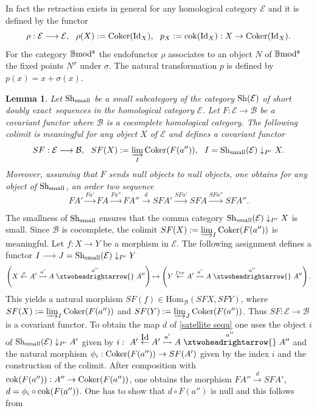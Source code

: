\documentclass[12pt]{article}
\newtheorem{lem}[thm]{Lemma}
\def\Hom{{\rm Hom}}
\def\id{{\rm id}}
\def\coker{{\rm Coker}}
\def\scoker{{\rm cok}}
\def\B{{\mathbb B}}
\def\exxx{{doubly exact}~}
\def\cB{{\mathcal B}}
\def\cE{{\mathcal E}}
\def\id{{\mbox{Id}}}
\def\Hom {{\mbox{Hom}}}
\def\sequ{{\rm Sh}}
\def\b2{{\rm \B mod^{\mathfrak s}}}
\begin{document}
 In fact the retraction exists in general for any homological category  $\cE$ and it is defined by the functor 
$$
\rho:\cE\longrightarrow \cE,\ \ \rho(X):=\coker(\id_X), \ \ p_X:=\scoker(\id_X):X\to \coker(\id_X).
$$
For  the category $\b2$ the endofunctor $\rho$ associates to an object $N$ of $\b2$  the fixed points $N^\sigma$ under $\sigma$. The natural transformation $p$ is defined by $p(x)=x+\sigma(x)$.
 \begin{lem}\label{first satellite} Let $\sequ_{\rm small}$ be a small subcategory of the category $\sequ(\cE)$ of short \exxx sequences in the homological category $\cE$. Let $F:\cE\longrightarrow \cB$ be a covariant functor where $\cB$ is a cocomplete  homological category. The following colimit is meaningful for any object $X$ of $\cE$ and defines a covariant functor
 \begin{equation}\label{Kan extension}
	SF:\cE\longrightarrow \cB, \ \ SF(X):=\varinjlim_I \coker(F(a'')), \ \ I=\sequ_{\rm small}(\cE)\downarrow_{P'} X.
\end{equation} 
Moreover, assuming  that $F$ sends null objects to null objects, one obtains for any object of $\sequ_{\rm small}$,  an order two sequence 
 \begin{equation}\label{satellite sequ}
	FA'\stackrel{F a'}{\to}FA\stackrel{Fa''}{\to}FA''\stackrel{d}{\to} SF A'\stackrel{SF a'}{\to}SF A\stackrel{SFa''}{\to}SFA''.\end{equation} 
  \end{lem} 
 \proof The smallness of $\sequ_{\rm small}$ ensures that the comma category $\sequ_{\rm small}(\cE)\downarrow_{P'} X$ is small. Since $\cB$ is cocomplete, the colimit $SF(X):=\varinjlim_I \coker(F(a''))$ is meaningful. Let $f:X\to Y$ be a morphism in $\cE$. The following assignment  defines a functor $I\longrightarrow J=\sequ_{\rm small}(\cE)\downarrow_{P'} Y$
 $$
 \left(X\stackrel{x}{\leftarrow} A'\stackrel{a'}{\rightarrowtail}A\stackrel{a''}{\xtwoheadrightarrow{}}A''\right)\mapsto \left(Y\stackrel{f\circ x}{\leftarrow} A'\stackrel{a'}{\rightarrowtail}A\stackrel{a''}{\xtwoheadrightarrow{}}A''\right).
 $$
 This  yields a natural morphism $SF(f)\in\Hom_\cB(SFX,SFY)$,  where $SF(X):=\varinjlim_I \coker(F(a''))$  and $SF(Y):=\varinjlim_J \coker(F(a''))$. Thus $SF:\cE\longrightarrow \cB$ is a covariant functor.   To obtain the map $d$ of \eqref{satellite sequ} one uses the object $i$ of $\sequ_{\rm small}(\cE)\downarrow_{P'} A'$ given by $i:~A'\stackrel{\id}{\leftarrow} A'\stackrel{a'}{\rightarrowtail}A\stackrel{a''}{\xtwoheadrightarrow{}}A''$
 and the natural morphism $\phi_i: \coker(F(a''))\to SF(A')$ given by the index $i$ and the construction of the colimit. After composition with $\scoker(F(a'')):A''\to\coker(F(a''))$, one obtains the morphism  $FA''\stackrel{d}{\to} SF A'$, $d=\phi_i\circ \scoker(F(a''))$. One has to show that $d\circ F(a'')$ is null and  this follows from 
\end{document}
